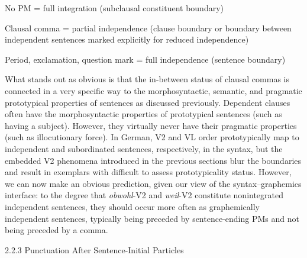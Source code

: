 \begin{listWWviiiNumiileveli}
\item \begin{styleMoutonText}
No PM = full integration (subclausal constituent boundary)
\end{styleMoutonText}
\item \begin{styleMoutonText}
Clausal comma = partial independence (clause boundary or boundary between independent sentences marked explicitly for reduced independence)
\end{styleMoutonText}
\item \begin{styleMoutonText}
Period, exclamation, question mark = full independence (sentence boundary)
\end{styleMoutonText}
\end{listWWviiiNumiileveli}
\begin{styleMoutonTextAfterExample}
What stands out as obvious is that the in-between status of clausal commas is connected in a very specific way to the morphosyntactic, semantic, and pragmatic prototypical properties of sentences as discussed previously. Dependent clauses often have the morphosyntactic properties of prototypical sentences (such as having a subject). However, they virtually never have their pragmatic properties (such as illocutionary force). In German, V2 and VL order prototypically map to independent and subordinated sentences, respectively, in the syntax, but the embedded V2 phenomena introduced in the previous sections blur the boundaries and result in exemplars with difficult to assess prototypicality status. However, we can now make an obvious prediction, given our view of the syntax–graphemics interface: to the degree that \textit{obwohl}{}-V2 and \textit{weil}{}-V2 constitute nonintegrated independent sentences, they should occur more often as graphemically independent sentences, typically being preceded by sentence-ending PMs and not being preceded by a comma.
\end{styleMoutonTextAfterExample}

\begin{styleMoutonHeadingii}
2.2.3  Punctuation After Sentence-Initial Particles
\end{styleMoutonHeadingii}

